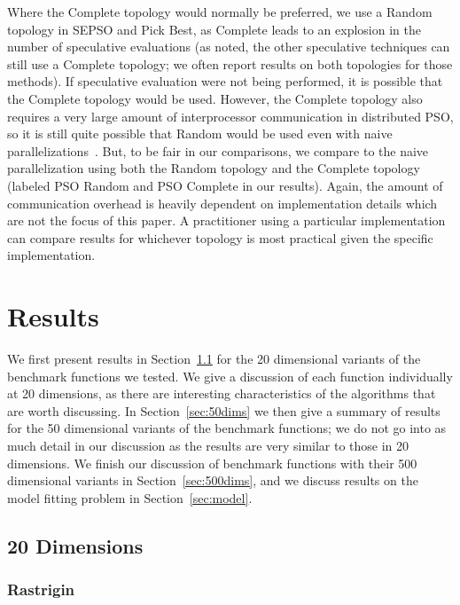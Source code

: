 \documentclass[smallcondensed]{svjour3}
\renewcommand{\sec}[1]{Section~\ref{sec:#1}}
\begin{document}
Where the Complete topology would normally be preferred, we use a Random
topology in SEPSO and Pick Best, as Complete leads to an explosion in the
number of speculative evaluations (as noted, the other speculative techniques
can still use a Complete topology; we often report results on both topologies
for those methods).  If speculative evaluation were not being performed, it is
possible that the Complete topology would be used.  However, the Complete
topology also requires a very large amount of interprocessor communication in
distributed PSO, so it is still quite possible that Random would be used even
with naive parallelizations~\cite{mcnabb-2009-large-particle-swarms}.  But,
to be fair in our comparisons, we compare to the naive parallelization using
both the Random topology and the Complete topology (labeled PSO Random and PSO
Complete in our results).  Again, the amount of communication overhead is
heavily dependent on implementation details which are not the focus of this
paper.  A practitioner using a particular implementation can compare results
for whichever topology is most practical given the specific implementation.

\section{Results}
\label{sec:results}

We first present results in \sec{20dims} for the 20 dimensional variants of the
benchmark functions we tested.  We give a discussion of each function
individually at 20 dimensions, as there are interesting characteristics of the
algorithms that are worth discussing.  In \sec{50dims} we then give a summary
of results for the 50 dimensional variants of the benchmark functions; we do
not go into as much detail in our discussion as the results are very similar to
those in 20 dimensions.  We finish our discussion of benchmark functions with
their 500 dimensional variants in \sec{500dims}, and we discuss results on the
model fitting problem in \sec{model}.

\subsection{20 Dimensions}
\label{sec:20dims}

\subsubsection{Rastrigin}
\end{document}
